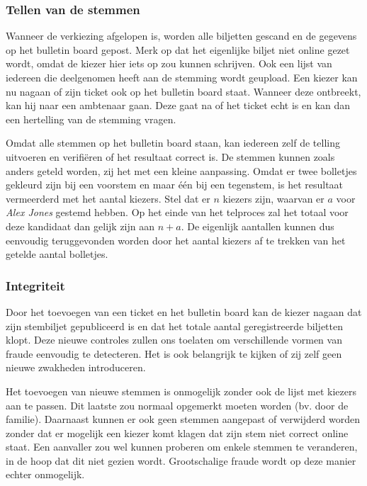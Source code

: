 \subsubsection{Tellen van de stemmen}

Wanneer de verkiezing afgelopen is, worden alle biljetten gescand en de gegevens op het bulletin board gepost. Merk op dat het eigenlijke biljet niet online gezet wordt, omdat de kiezer hier iets op zou kunnen schrijven. Ook een lijst van iedereen die deelgenomen heeft aan de stemming wordt geupload. Een kiezer kan nu nagaan of zijn ticket ook op het bulletin board staat. Wanneer deze ontbreekt, kan hij naar een ambtenaar gaan. Deze gaat na of het ticket echt is en kan dan een hertelling van de stemming vragen.

\npar Omdat alle stemmen op het bulletin board staan, kan iedereen zelf de telling uitvoeren en verifi\"eren of het resultaat correct is. De stemmen kunnen zoals anders geteld worden, zij het met een kleine aanpassing. Omdat er twee bolletjes gekleurd zijn bij een voorstem en maar \'e\'en bij een tegenstem, is het resultaat vermeerderd met het aantal kiezers. Stel dat er $n$ kiezers zijn, waarvan er $a$ voor \textit{Alex Jones} gestemd hebben. Op het einde van het telproces zal het totaal voor deze kandidaat dan gelijk zijn aan $n+a$. De eigenlijk aantallen kunnen dus eenvoudig teruggevonden worden door het aantal kiezers af te trekken van het getelde aantal bolletjes.

\subsubsection{Integriteit}
\label{sec:ls:integriteit}

Door het toevoegen van een ticket en het bulletin board kan de kiezer nagaan dat zijn stembiljet gepubliceerd is en dat het totale aantal geregistreerde biljetten klopt. Deze nieuwe controles zullen ons toelaten om verschillende vormen van fraude eenvoudig te detecteren. Het is ook belangrijk te kijken of zij zelf geen nieuwe zwakheden introduceren.

\npar Het toevoegen van nieuwe stemmen is onmogelijk zonder ook de lijst met kiezers aan te passen. Dit laatste zou normaal opgemerkt moeten worden (bv. door de familie). Daarnaast kunnen er ook geen stemmen aangepast of verwijderd worden zonder dat er mogelijk een kiezer komt klagen dat zijn stem niet correct online staat. Een aanvaller zou wel kunnen proberen om enkele stemmen te veranderen, in de hoop dat dit niet gezien wordt. Grootschalige fraude wordt op deze manier echter onmogelijk.

